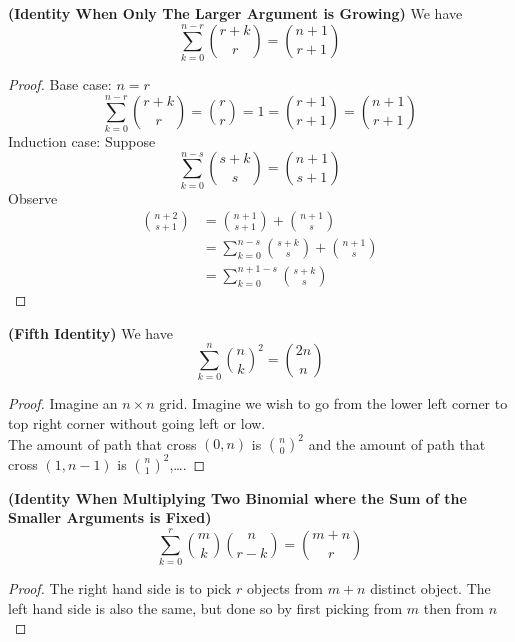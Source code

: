 \documentclass{report}
\begin{document}
\begin{theorem}
\textbf{(Identity When Only The Larger Argument is Growing)} We have
\begin{equation*}
\sum_{k=0}^{n-r} \binom{r+k}{r}=\binom{n+1}{r+1}
\end{equation*}
\end{theorem}
\begin{proof}
Base case: $n=r$ 
\begin{equation*}
\sum_{k=0}^{n-r}\binom{r+k}{r}=\binom{r}{r}=1=\binom{r+1}{r+1}=\binom{n+1}{r+1}
\end{equation*}
Induction case: Suppose
 \begin{equation*}
\sum_{k=0}^{n-s} \binom{s+k}{s}=\binom{n+1}{s+1}
\end{equation*}
Observe 
\begin{align*}
\binom{n+2}{s+1}&=\binom{n+1}{s+1}+\binom{n+1}{s}\\
&=\sum_{k=0}^{n-s} \binom{s+k}{s}+\binom{n+1}{s}\\
&=\sum_{k=0}^{n+1-s}\binom{s+k}{s}
\end{align*}
\end{proof}
\begin{theorem}
\textbf{(Fifth Identity)} We have
\begin{equation*}
\sum_{k=0}^n \binom{n}{k}^2 =\binom{2n}{n}
\end{equation*}
\end{theorem}
\begin{proof}
Imagine an $n\times n$ grid. Imagine we wish to go from the lower left corner to top right corner without going left or low.\\

The amount of path that cross $(0,n)$ is $\binom{n}{0}^2$ and the amount of path that cross $(1,n-1)$ is $\binom{n}{1}^2$,\dots .
\end{proof}
\begin{theorem}
\textbf{(Identity When Multiplying Two Binomial where the Sum of the Smaller Arguments is Fixed)} 
\begin{equation*}
\sum_{k=0}^r \binom{m}{k}\binom{n}{r-k}=\binom{m+n}{r}
\end{equation*}
\end{theorem}
\begin{proof}
The right hand side is to pick $r$ objects from  $m+n$ distinct object. The left hand side is also the same, but done so by first picking from  $m$ then from  $n$
\end{proof}
\end{document}
